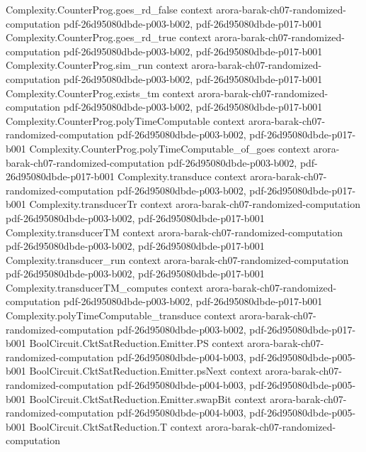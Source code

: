 \begin{theorem}
\proofstep
  {Complexity.CounterProg.goes_rd_false}
  {context}
  {arora-barak-ch07-randomized-computation}
  {pdf-26d95080dbde-p003-b002,
    pdf-26d95080dbde-p017-b001}
\proofstep
  {Complexity.CounterProg.goes_rd_true}
  {context}
  {arora-barak-ch07-randomized-computation}
  {pdf-26d95080dbde-p003-b002,
    pdf-26d95080dbde-p017-b001}
\proofstep
  {Complexity.CounterProg.sim_run}
  {context}
  {arora-barak-ch07-randomized-computation}
  {pdf-26d95080dbde-p003-b002,
    pdf-26d95080dbde-p017-b001}
\proofstep
  {Complexity.CounterProg.exists_tm}
  {context}
  {arora-barak-ch07-randomized-computation}
  {pdf-26d95080dbde-p003-b002,
    pdf-26d95080dbde-p017-b001}
\proofstep
  {Complexity.CounterProg.polyTimeComputable}
  {context}
  {arora-barak-ch07-randomized-computation}
  {pdf-26d95080dbde-p003-b002,
    pdf-26d95080dbde-p017-b001}
\proofstep
  {Complexity.CounterProg.polyTimeComputable_of_goes}
  {context}
  {arora-barak-ch07-randomized-computation}
  {pdf-26d95080dbde-p003-b002,
    pdf-26d95080dbde-p017-b001}
\proofstep
  {Complexity.transduce}
  {context}
  {arora-barak-ch07-randomized-computation}
  {pdf-26d95080dbde-p003-b002,
    pdf-26d95080dbde-p017-b001}
\proofstep
  {Complexity.transducerTr}
  {context}
  {arora-barak-ch07-randomized-computation}
  {pdf-26d95080dbde-p003-b002,
    pdf-26d95080dbde-p017-b001}
\proofstep
  {Complexity.transducerTM}
  {context}
  {arora-barak-ch07-randomized-computation}
  {pdf-26d95080dbde-p003-b002,
    pdf-26d95080dbde-p017-b001}
\proofstep
  {Complexity.transducer_run}
  {context}
  {arora-barak-ch07-randomized-computation}
  {pdf-26d95080dbde-p003-b002,
    pdf-26d95080dbde-p017-b001}
\proofstep
  {Complexity.transducerTM_computes}
  {context}
  {arora-barak-ch07-randomized-computation}
  {pdf-26d95080dbde-p003-b002,
    pdf-26d95080dbde-p017-b001}
\proofstep
  {Complexity.polyTimeComputable_transduce}
  {context}
  {arora-barak-ch07-randomized-computation}
  {pdf-26d95080dbde-p003-b002,
    pdf-26d95080dbde-p017-b001}
\proofstep
  {BoolCircuit.CktSatReduction.Emitter.PS}
  {context}
  {arora-barak-ch07-randomized-computation}
  {pdf-26d95080dbde-p004-b003,
    pdf-26d95080dbde-p005-b001}
\proofstep
  {BoolCircuit.CktSatReduction.Emitter.psNext}
  {context}
  {arora-barak-ch07-randomized-computation}
  {pdf-26d95080dbde-p004-b003,
    pdf-26d95080dbde-p005-b001}
\proofstep
  {BoolCircuit.CktSatReduction.Emitter.swapBit}
  {context}
  {arora-barak-ch07-randomized-computation}
  {pdf-26d95080dbde-p004-b003,
    pdf-26d95080dbde-p005-b001}
\proofstep
  {BoolCircuit.CktSatReduction.T}
  {context}
  {arora-barak-ch07-randomized-computation}

\end{theorem}
